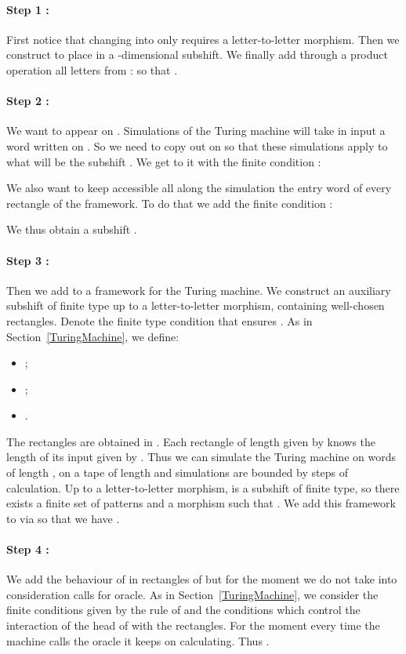 \documentclass[proceedings]{stacs}
\theoremstyle{plain}\newtheorem{satz}[thm]{Satz}
\theoremstyle{definition}\newtheorem{crucial}[thm]{Crucial Definition}
\begin{document}
\paragraph{Step 1 :} First notice that changing  into  only requires a letter-to-letter morphism. Then we construct  to place  in a -dimensional subshift. We finally add through a product operation  all letters from  :  so that .

\paragraph{Step 2 :} We want  to appear on . Simulations of the Turing machine  will take in input a word written on . So we need to copy out  on  so that these simulations apply to what will be the subshift . We get to it with the finite condition :

We also want to keep accessible all along the simulation the entry word of every rectangle of the framework. To do that we add the finite condition :

We thus obtain a subshift .
\paragraph{Step 3 :} Then we add to  a framework for the Turing machine. We construct  an auxiliary subshift of finite type up to a letter-to-letter morphism, containing well-chosen rectangles. Denote  the finite type condition that ensures . As in Section~\ref{TuringMachine}, we define:
\begin{itemize}
\item  ;
\item  ;
\item  .
\end{itemize}

The rectangles are obtained in . Each rectangle of length  given by  knows the length of its input  given by . Thus we can simulate the Turing machine on words of length , on a tape of length  and simulations are bounded by  steps of calculation. Up to a letter-to-letter morphism,  is a subshift of finite type, so there exists a finite set of patterns  and a morphism  such that . We add this framework to  via  so that we have .

\paragraph{Step 4 :} We add the behaviour of  in rectangles of  but for the moment we do not take into consideration calls for oracle. As in Section~\ref{TuringMachine}, we consider the finite conditions  given by the rule of  and the conditions  which control the interaction of the head of  with the rectangles. For the moment every time the machine calls the oracle it keeps on calculating. Thus .
\end{document}
